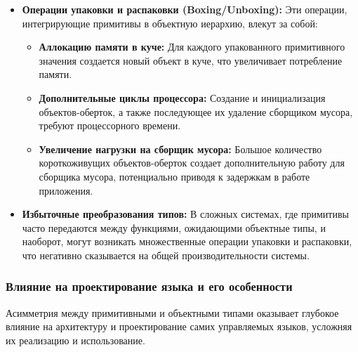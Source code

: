 \begin{itemize}[leftmargin=*,nosep]
    \item \textbf{Операции упаковки и распаковки (Boxing/Unboxing):} Эти операции, интегрирующие примитивы в объектную иерархию, влекут за собой:
    \begin{itemize}
        \item \textbf{Аллокацию памяти в куче:} Для каждого упакованного примитивного значения создается новый объект в куче, что увеличивает потребление памяти.
        \item \textbf{Дополнительные циклы процессора:} Создание и инициализация объектов-оберток, а также последующее их удаление сборщиком мусора, требуют процессорного времени.
        \item \textbf{Увеличение нагрузки на сборщик мусора:} Большое количество короткоживущих объектов-оберток создает дополнительную работу для сборщика мусора, потенциально приводя к задержкам в работе приложения.
    \end{itemize}

    \item \textbf{Избыточные преобразования типов:} В сложных системах, где примитивы часто передаются между функциями, ожидающими объектные типы, и наоборот, могут возникать множественные операции упаковки и распаковки, что негативно сказывается на общей производительности системы.
\end{itemize}

\subsubsection*{Влияние на проектирование языка и его особенности}

Асимметрия между примитивными и объектными типами оказывает глубокое влияние на архитектуру и проектирование самих управляемых языков, усложняя их реализацию и использование.

